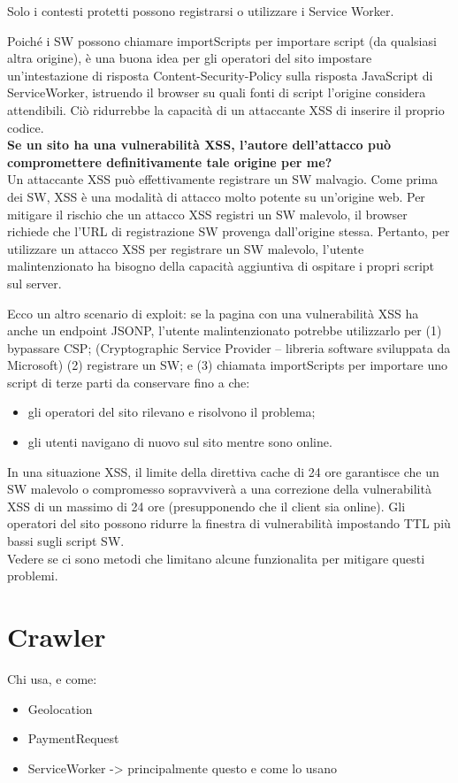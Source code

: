 \documentclass[italian]{article}
\begin{document}
\begin{itemize}
Solo i contesti protetti possono registrarsi o utilizzare i Service Worker.

Poiché i SW possono chiamare importScripts per importare script (da qualsiasi altra origine), è una buona idea per gli operatori del sito impostare un'intestazione di risposta Content-Security-Policy sulla risposta JavaScript di ServiceWorker, istruendo il browser su quali fonti di script l'origine considera attendibili. Ciò ridurrebbe la capacità di un attaccante XSS di inserire il proprio codice.
\\
\textbf{Se un sito ha una vulnerabilità XSS, l'autore dell'attacco può compromettere definitivamente tale origine per me?}
\\
Un attaccante XSS può effettivamente registrare un SW malvagio. Come prima dei SW, XSS è una modalità di attacco molto potente su un'origine web. Per mitigare il rischio che un attacco XSS registri un SW malevolo, il browser richiede che l'URL di registrazione SW provenga dall'origine stessa. Pertanto, per utilizzare un attacco XSS per registrare un SW malevolo, l'utente malintenzionato ha bisogno della capacità aggiuntiva di ospitare i propri script sul server.

Ecco un altro scenario di exploit: se la pagina con una vulnerabilità XSS ha anche un endpoint JSONP, l'utente malintenzionato potrebbe utilizzarlo per (1) bypassare CSP; (Cryptographic Service Provider – libreria software sviluppata da Microsoft) (2) registrare un SW; e (3) chiamata importScripts per importare uno script di terze parti da conservare fino a che:
\begin{itemize}
\item gli operatori del sito rilevano e risolvono il problema; 
\item gli utenti navigano di nuovo sul sito mentre sono online.
\end{itemize}
In una situazione XSS, il limite della direttiva cache di 24 ore garantisce che un SW malevolo o compromesso sopravviverà a una correzione della vulnerabilità XSS di un massimo di 24 ore (presupponendo che il client sia online). Gli operatori del sito possono ridurre la finestra di vulnerabilità impostando TTL più bassi sugli script SW.
\\
Vedere se ci sono metodi che limitano alcune funzionalita per mitigare questi problemi.
\end{itemize}

\section{Crawler}
Chi usa, e come:
\begin{itemize}
\item Geolocation
\item PaymentRequest
\item ServiceWorker -> principalmente questo e come lo usano
\end{itemize}
\end{document}

